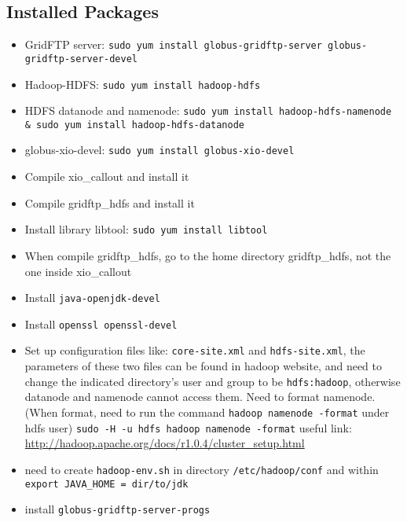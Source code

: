 \documentclass[a4paper]{article}
\begin{document}
\subsection{Installed Packages}
\begin{itemize}
\item GridFTP server: {\tt sudo yum install globus-gridftp-server globus-gridftp-server-devel}
\item Hadoop-HDFS: {\tt sudo yum install hadoop-hdfs}
\item HDFS datanode and namenode: {\tt sudo yum install hadoop-hdfs-namenode \& sudo yum install hadoop-hdfs-datanode}
\item globus-xio-devel: {\tt sudo yum install globus-xio-devel}
\item Compile xio\_callout and install it
\item Compile gridftp\_hdfs and install it
\item Install library libtool: {\tt sudo yum install libtool}
\item When compile gridftp\_hdfs, go to the home directory gridftp\_hdfs, not the one inside xio\_callout
\item Install {\tt java-openjdk-devel}
\item Install {\tt openssl openssl-devel}
\item Set up configuration files like: {\tt core-site.xml} and {\tt hdfs-site.xml}, the parameters of these two files can be found in hadoop website, and need to change the indicated directory’s user and group to be {\tt hdfs:hadoop}, otherwise datanode and namenode cannot access them. Need to format namenode. (When format, need to run the command {\tt hadoop namenode -format} under hdfs user) {\tt sudo -H -u hdfs hadoop namenode -format} useful link: \url{ http://hadoop.apache.org/docs/r1.0.4/cluster\_setup.html}
\item need to create {\tt hadoop-env.sh} in directory {\tt /etc/hadoop/conf} and within {\tt export JAVA\_HOME = dir/to/jdk}
\item install {\tt globus-gridftp-server-progs}
\end{itemize}
\end{document}
